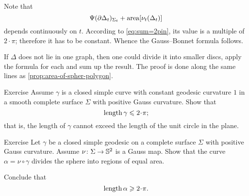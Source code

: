 Note that 
\[\Psi({\partial\Delta_t})_{\Sigma_t}+\mathop{\rm area}\nolimits[\nu_t(\Delta_t)]\]
depends continuously on $t$.
According to \ref{eq:sum=2pin}, its value is a multiple of $2\cdot\pi$;
therefore it has to be constant.
Whence the Gauss--Bonnet formula follows.

If $\Delta$ does not lie in one graph, then one could divide it into smaller discs, apply the formula for each and sum up the result.
The proof is done along the same lines as \ref{prop:area-of-spher-polygon}.
\qeds



\begin{thm}{Exercise}\label{ex:1=geodesic-curvature}
 Assume $\gamma$ is a closed simple curve with constant geodesic curvature $1$ in a smooth complete surface $\Sigma$ with positive Gauss curvature.
 Show that 
 \[\length\gamma\le 2\cdot\pi;\]
that is, the length of $\gamma$ cannot exceed the length of the unit circle in the plane.  
\end{thm}


\begin{thm}{Exercise}\label{ex:geodesic-half}
Let $\gamma$ be a closed simple geodesic on a complete surface $\Sigma$ with positive Gauss curvature.
Assume $\nu\colon\Sigma\to\mathbb{S}^2$ is a Gauss map.
Show that the curve $\alpha=\nu\circ\gamma$ divides the sphere into regions of equal area.

Conclude that
\[\length \alpha\ge 2\cdot\pi.\]
\end{thm}

